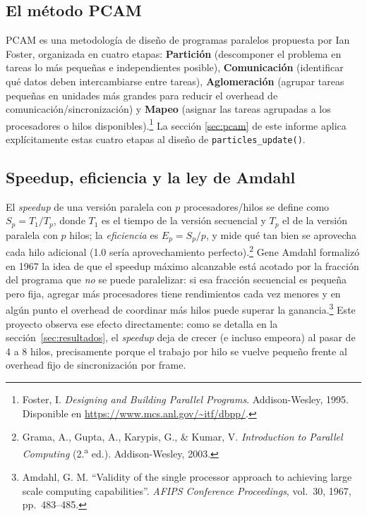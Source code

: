 \documentclass[12pt,letterpaper]{article}
\begin{document}
\subsection{El método PCAM}

PCAM es una metodología de diseño de programas paralelos propuesta por
Ian Foster, organizada en cuatro etapas: \textbf{Partición}
(descomponer el problema en tareas lo más pequeñas e independientes
posible), \textbf{Comunicación} (identificar qué datos deben
intercambiarse entre tareas), \textbf{Aglomeración} (agrupar tareas
pequeñas en unidades más grandes para reducir el overhead de
comunicación/sincronización) y \textbf{Mapeo} (asignar las tareas
agrupadas a los procesadores o hilos disponibles).\footnote{Foster, I.
\emph{Designing and Building Parallel Programs}. Addison-Wesley, 1995.
Disponible en \url{https://www.mcs.anl.gov/~itf/dbpp/}.} La sección
\ref{sec:pcam} de este informe aplica explícitamente estas cuatro etapas
al diseño de \texttt{particles\_update()}.

\subsection{Speedup, eficiencia y la ley de Amdahl}

El \emph{speedup} de una versión paralela con $p$ procesadores/hilos se
define como $S_p = T_1 / T_p$, donde $T_1$ es el tiempo de la versión
secuencial y $T_p$ el de la versión paralela con $p$ hilos; la
\emph{eficiencia} es $E_p = S_p / p$, y mide qué tan bien se aprovecha
cada hilo adicional (1.0 sería aprovechamiento
perfecto).\footnote{Grama, A., Gupta, A., Karypis, G., \& Kumar, V.
\emph{Introduction to Parallel Computing} (2.\textsuperscript{a} ed.).
Addison-Wesley, 2003.} Gene Amdahl formalizó en 1967 la idea de que el
speedup máximo alcanzable está acotado por la fracción del programa que
\emph{no} se puede paralelizar: si esa fracción secuencial es pequeña
pero fija, agregar más procesadores tiene rendimientos cada vez menores
y en algún punto el overhead de coordinar más hilos puede superar la
ganancia.\footnote{Amdahl, G. M. ``Validity of the single processor
approach to achieving large scale computing capabilities''. \emph{AFIPS
Conference Proceedings}, vol.\ 30, 1967, pp.\ 483--485.} Este proyecto
observa ese efecto directamente: como se detalla en la
sección~\ref{sec:resultados}, el \emph{speedup} deja de crecer (e incluso
empeora) al pasar de 4 a 8 hilos, precisamente porque el trabajo por hilo
se vuelve pequeño frente al overhead fijo de sincronización por frame.
\end{document}

